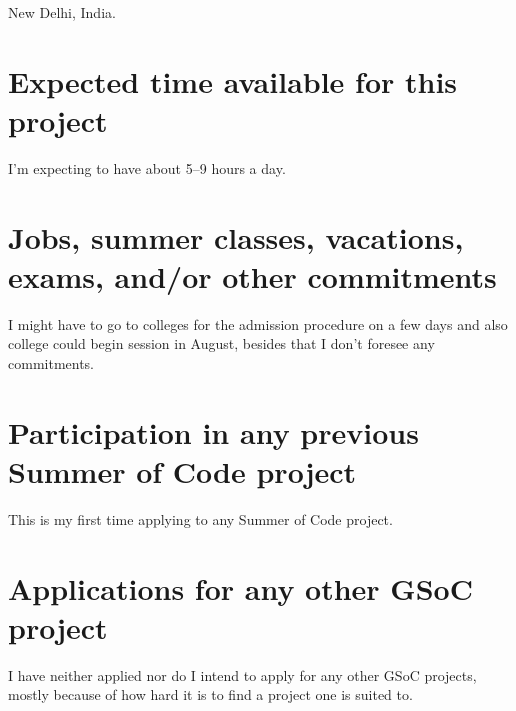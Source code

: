 \documentclass[11pt]{article}
\begin{document}
    New Delhi, India.




    \section{Expected time available for this project}
    \label{sec:availability}

    I'm expecting to have about 5--9 hours a day.




    \section{Jobs, summer classes, vacations, exams, and/or other commitments}
    \label{sec:commitments}

    I might have to go to colleges for the admission procedure on a few days and also college could begin session in
    August, besides that I don't foresee any commitments.




    \section{Participation in any previous Summer of Code project}
    \label{sec:previous-participation}

    This is my first time applying to any Summer of Code project.




    \section{Applications for any other GSoC project}
    \label{sec:other-applications}

    I have neither applied nor do I intend to apply for any other GSoC projects, mostly because of how hard it is to
    find a project one is suited to.


\end{document}
